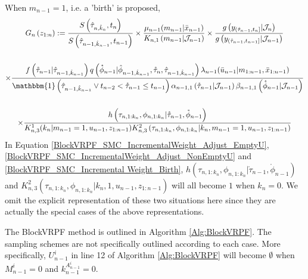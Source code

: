 \documentclass[12pt,a4paper]{article}
\begin{document}
When $m_{n-1} = 1$, i.e. a 'birth' is proposed, 
\begin{multline}
    \label{BlockVRPF_SMC_Incremental Weight_Birth}
    G_{n}\left(z_{1:n}\right) := \frac{S\left(\hat{\tau}_{n,\hat{k}_n},t_n\right)}{S\left(\hat{\tau}_{n-1,\hat{k}_{n-1}},t_{n-1}\right)} \times \frac{\mu_{n-1}(m_{n-1}|\bar{x}_{n-1})}{K_{n,1}\left(m_{n-1}|\mathcal{J}_{n-1}\right)}\times \frac{g\left(y_{(\mathring{\tau}_{n-1},t_n]}|\mathcal{J}_n\right)}{g\left(y_{(\mathring{\tau}_{n-1},t_{n-1}]}|\mathcal{J}_{n-1}\right)}\\\\
    \times \frac{f\left(\mathring{\tau}_{n-1}|\hat{\tau}_{n-1,\hat{k}_{n-1}}\right)q\left(\mathring{\phi}_{n-1}|\hat{\phi}_{n-1,\hat{k}_{n-1}},\mathring{\tau}_{n},\hat{\tau}_{n-1,\hat{k}_{n-1}}\right)\lambda_{n-1}(\bar{u}_{n-1}|m_{1:n-1},\bar{x}_{1:n-1})}{\mathbbm{1}\left(\hat{\tau}_{n-1,\hat{k}_{n-1}} \vee t_{n-2}  < \mathring{\tau}_{n-1} \leq t_{n-1} \right)\alpha_{n-1,1}\left(\mathring{\tau}_{n-1}|\mathcal{J}_{n-1}\right)\beta_{n-1,1}\left(\mathring{\phi}_{n-1}|\mathcal{J}_{n-1}\right)}\\\\
    \times \frac{h\left(\tau_{n,1:k_n},\phi_{n,1:k_n}|\mathring{\tau}_{n-1},\mathring{\phi}_{n-1}\right)}{K_{n,3}^1(k_n|m_{n-1}=1,u_{n-1},z_{1:n-1})K_{n,3}^{2}\left(\tau_{n,1:k_n},\phi_{n,1:k_n}|k_n,m_{n-1}=1,u_{n-1},z_{1:n-1}\right)}
\end{multline}
In Equation \eqref{BlockVRPF_SMC_IncrementalWeight_Adjust_EmptyU}, \eqref{BlockVRPF_SMC_IncrementalWeight_Adjust_NonEmptyU} and \eqref{BlockVRPF_SMC_Incremental Weight_Birth}, $h\left(\tau_{n,1:k_n},\phi_{n,1:k_n}|\mathring{\tau}_{n-1},\mathring{\phi}_{n-1}\right)$ and $K_{n,3}^{2}\left(\tau_{n,1:k_n},\phi_{n,1:k_n}|k_n,1,u_{n-1},z_{1:n-1}\right)$ will all become $1$ when $k_n=0$. We omit the explicit representation of these two situations here since they are actually the special cases of the above representations. 

The BlockVRPF method is outlined in Algorithm \ref{Alg:BlockVRPF}. The sampling schemes are not specifically outlined according to each case. More specifically, $U_{n-1}^i$ in line 12 of Algorithm \ref{Alg:BlockVRPF} will become $\emptyset$ when $M_{n-1}^i = 0$ and $k_{n-1}^{A_{n-1}^i} = 0$. 
\end{document}
